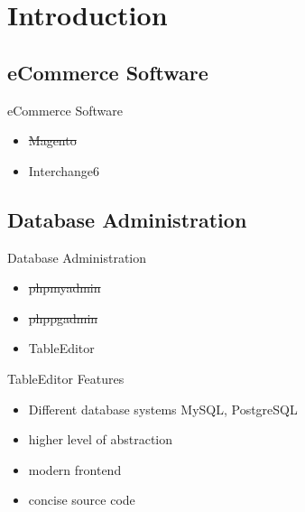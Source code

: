 
\section{Introduction}


\subsection{eCommerce Software}
\begin{frame}{eCommerce Software}
\begin{itemize}
\item \sout{Magento}
\item Interchange6
\end{itemize}
\end{frame}

\subsection{Database Administration}
\begin{frame}{Database Administration}
\begin{itemize}
\item \sout{phpmyadmin}
\item \sout{phppgadmin}
\item TableEditor
\end{itemize}
\end{frame}

\begin{frame}{TableEditor Features}
\begin{itemize}
\item Different database systems
      MySQL, PostgreSQL
\item higher level of abstraction
\item modern frontend
\item concise source code
\end{itemize}
\end{frame}

